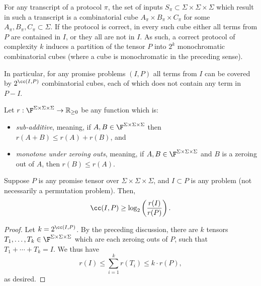 For any transcript of a protocol $\pi$, the set of inputs $S_{\pi} \subset \Sigma \times \Sigma \times \Sigma$ which result in such a transcript is a combinatorial cube $A_\pi \times B_\pi \times C_\pi$ for some $A_\pi, B_\pi, C_\pi \subset \Sigma$. If the protocol is correct, in every such cube either all terms from $P$ are contained in $I$, or they all are not in $I$. As such, a correct protocol of complexity $k$ induces a partition of the tensor $P$ into $2^k$ monochromatic combinatorial cubes (where a cube is monochromatic in the preceding sense). 

In particular, for any promise problems $(I, P)$ all terms from $I$ can be covered by $2^{\cc(I, P)}$ combinatorial cubes, each of which does not contain any term in $P - I$.

\begin{theorem} \label{thm:subadditive}
Let $r : \F^{\Sigma \times \Sigma \times \Sigma} \to \mathbb{R}_{\geq 0}$ be any function which is:
\begin{itemize}
    \item \emph{sub-additive}, meaning, if $A,B \in \F^{\Sigma \times \Sigma \times \Sigma}$ then $r(A+B) \leq r(A) + r(B)$, and
    \item \emph{monotone under zeroing outs}, meaning, if  $A,B \in \F^{\Sigma \times \Sigma \times \Sigma}$ and $B$ is a zeroing out of $A$, then $r(B) \leq r(A)$.
\end{itemize}
Suppose $P$ is any promise tensor over $\Sigma \times \Sigma \times \Sigma$, and $I \subset P$ is any problem (not necessarily a permutation problem). Then, $$\cc(I,P) \geq \log_2\left( \frac{r(I)}{r(P)} \right).$$
\end{theorem}


\begin{proof}
   Let $k = 2^{\cc(I,P)}$. By the preceding discussion, there are $k$ tensors $T_1, \ldots, T_k \in \F^{\Sigma \times \Sigma \times \Sigma}$ which are each zeroing outs of $P$, such that $T_1 + \cdots + T_k = I$. We thus have $$r(I) \leq \sum_{i=1}^k r(T_i) \leq k \cdot r(P),$$
    as desired.
\end{proof}

